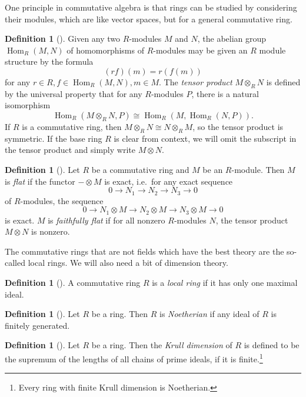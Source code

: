 \documentclass{amsart}
\theoremstyle{definition}
\newtheorem{defn}[thm]{Definition}
\theoremstyle{remark}
\theoremstyle{plain}
\theoremstyle{definition}
\theoremstyle{remark}
\newcommand{\1}{\mathbf{1}}
\newcommand{\2}{\mathbf{2}}
\newcommand{\3}{\mathbf{3}}
\DeclareMathOperator{\Hom}{Hom}
\begin{document}
One principle in commutative algebra is that rings can be studied by considering their modules, which are like vector spaces, but for a general commutative ring.

\begin{defn}[{\cite[\href{https://stacks.math.columbia.edu/tag/00DE}{Tag 00DE}]{stacks}}]
    Given any two $R$-modules $M$ and $N$, the abelian group $\Hom_R(M,N)$ of homomorphisms of $R$-modules may be given an $R$ module structure by the formula
    \[ (rf)(m) = r (f(m)) \]
    for any $r \in R, f \in \Hom_R(M,N), m \in M$. The \textit{tensor product} $M \otimes_R N$ is defined by the universal property that for any $R$-modules $P$, there is a natural isomorphism
    \[ \Hom_R(M \otimes_R N, P) \cong \Hom_R(M, \Hom_R(N, P)). \]
    If $R$ is a commutative ring, then $M \otimes_R N \cong N \otimes_R M$, so the tensor product is symmetric. If the base ring $R$ is clear from context, we will omit the subscript in the tensor product and simply write $M \otimes N$.
\end{defn}


\begin{defn}[{\cite[Definition 2.1.3, Theorem 2.2.9]{canotes}}]
    Let $R$ be a commutative ring and $M$ be an $R$-module. Then $M$ is \textit{flat} if the functor $- \otimes M$ is exact, i.e.\ for any exact sequence
    \[ 0 \to N_1 \to N_2 \to N_3 \to 0 \]
    of $R$-modules, the sequence
    \[ 0 \to N_1 \otimes M \to N_2 \otimes M \to N_3 \otimes M \to 0 \]
    is exact. $M$ is \textit{faithfully flat} if for all nonzero $R$-modules $N$, the tensor product $M \otimes N$ is nonzero.
\end{defn}


The commutative rings that are not fields which have the best theory are the so-called local rings. We will also need a bit of dimension theory.
\begin{defn}[{\cite[Definition 1.3.4]{canotes}}]
    A commutative ring $R$ is a \textit{local ring} if it has only one maximal ideal.
\end{defn}

\begin{defn}[{\cite[Proposition 1.4.5]{canotes}}]
    Let $R$ be a ring. Then $R$ is \textit{Noetherian} if any ideal of $R$ is finitely generated.
\end{defn}


\begin{defn}[{\cite[Section 3.2]{canotes}}]
    Let $R$ be a ring. Then the \textit{Krull dimension} of $R$ is defined to be the supremum of the lengths of all chains of prime ideals, if it is finite.\footnote{Every ring with finite Krull dimension is Noetherian.}
\end{defn}
\end{document}
